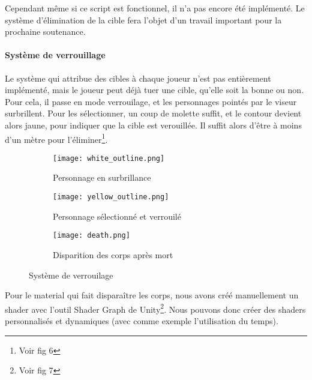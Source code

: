             Cependant même si ce script est fonctionnel, il n'a pas encore été implémenté. 
            Le système d'élimination de la cible fera l'objet d'un travail important pour la prochaine soutenance.
        
        
        \paragraph{Système de verrouillage}
            
            Le système qui attribue des cibles à chaque joueur n'est pas entièrement implémenté, mais le joueur peut déjà tuer une cible, qu'elle soit la bonne ou non.
            Pour cela, il passe en mode verrouilage, et les personnages pointés par le viseur surbrillent.
            Pour les sélectionner, un coup de molette suffit, et le contour devient alors jaune, pour indiquer que la cible est verouillée.
            Il suffit alors d'être à moins d'un mètre pour l'éliminer\footnote{Voir fig 6}.

            \begin{figure}[hbt!]
                \centering
                \begin{subfigure}[b]{0.3\textwidth}
                    \texttt{[image: white\_outline.png]} 
                    \caption{Personnage en surbrillance}
                \end{subfigure}
                \hspace{150pt}
                \begin{subfigure}[b]{0.3\textwidth}
                    \texttt{[image: yellow\_outline.png]} 
                    \caption{Personnage sélectionné et verrouilé}
                \end{subfigure}

                \begin{subfigure}[b]{0.3\textwidth}
                    \texttt{[image: death.png]} 
                    \caption{Disparition des corps après mort}
                \end{subfigure}
                \caption{Système de verrouilage}
            \end{figure}
			\FloatBarrier

            Pour le material qui fait disparaître les corps, nous avons créé manuellement un shader avec l'outil Shader Graph de Unity\footnote{Voir fig 7}.
            Nous pouvons donc créer des shaders personnalisés et dynamiques (avec comme exemple l'utilisation du temps).

